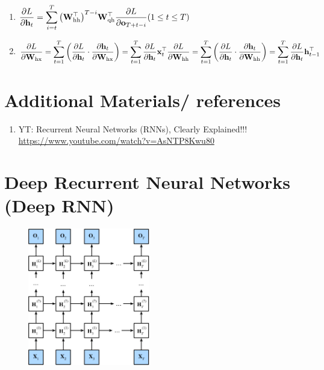 \begin{enumerate}[itemsep=0.2cm]
    \item 
    $
        \dfrac{\partial L}{\partial \mathbf{h}_t}
        = \dsum_{i=t}^T {\left(\mathbf{W}_\textrm{hh}^\top\right)}^{T-i} \mathbf{W}_\textrm{qh}^\top \dfrac{\partial L}{\partial \mathbf{o}_{T+t-i}}
        \hfill
        (1 \leq t \leq T)
    $

    \item 
    $
        \dfrac{\partial L}{\partial \mathbf{W}_\textrm{hx}}
        = \dsum_{t=1}^T \left(\dfrac{\partial L}{\partial \mathbf{h}_t} \cdot \dfrac{\partial \mathbf{h}_t}{\partial \mathbf{W}_\textrm{hx}}\right)
        = \dsum_{t=1}^T \dfrac{\partial L}{\partial \mathbf{h}_t} \mathbf{x}_t^\top
        \hfill
        \dfrac{\partial L}{\partial \mathbf{W}_\textrm{hh}}
        = \dsum_{t=1}^T \left(\dfrac{\partial L}{\partial \mathbf{h}_t} \cdot \dfrac{\partial \mathbf{h}_t}{\partial \mathbf{W}_\textrm{hh}}\right)
        = \dsum_{t=1}^T \dfrac{\partial L}{\partial \mathbf{h}_t} \mathbf{h}_{t-1}^\top
        \hfill
    $

    
\end{enumerate}


\section*{Additional Materials/ references}
\begin{enumerate}
    \item YT: Recurrent Neural Networks (RNNs), Clearly Explained!!!\\
    \url{https://www.youtube.com/watch?v=AsNTP8Kwu80}

\end{enumerate}



\section{Deep Recurrent Neural Networks (Deep RNN) \cite{dnn-1}} \label{Deep Recurrent Neural Networks}

\begin{figure}[H]
    \centering
    \includegraphics[width=\linewidth, height=6cm, keepaspectratio]{Pictures/deep-reinforcement-learning/deep-rnn.jpg}
\end{figure}


